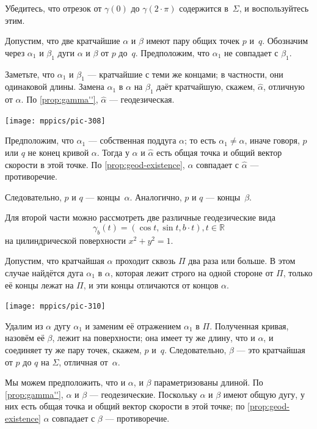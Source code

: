 \begin{multicols}{2}
Убедитесь, что отрезок от $\gamma (0)$ до $\gamma (2{\cdot}\pi)$ содержится в~$\Sigma$,
и воспользуйтесь этим.

Допустим, что две кратчайшие $\alpha$ и $\beta$ имеют пару общих точек $p$ и~$q$.
Обозначим через $\alpha_1$ и $\beta_1$ дуги $\alpha$ и $\beta$ от $p$ до~$q$.
Предположим, что $\alpha_1$ не совпадает с $\beta_1$.

Заметьте, что $\alpha_1$ и $\beta_1$ --- кратчайшие с теми же концами;
в частности, они одинаковой длины.
Замена $\alpha_1$ в $\alpha$ на $\beta_1$ даёт кратчайшую, скажем, $\hat\alpha$, отличную от $\alpha$.
По \ref{prop:gamma''}, $\hat\alpha$ --- геодезическая.

\begin{Figure}
\vskip-0mm
\centering
\texttt{[image: mppics/pic-308]}
\vskip0mm
\end{Figure}

Предположим, что $\alpha_1$ --- собственная поддуга $\alpha$;
то есть $\alpha_1\ne\alpha$, иначе говоря, $p$ или $q$ не конец кривой $\alpha$.
Тогда у $\alpha$ и $\hat\alpha$ есть общая точка и общий вектор скорости в этой точке.
По \ref{prop:geod-existence}, $\alpha$ совпадает с $\hat\alpha$ --- противоречие.

Следовательно, $p$ и $q$ --- концы~$\alpha$.
Аналогично, $p$ и $q$ --- концы~$\beta$.

Для второй части можно рассмотреть две различные геодезические вида 
\[ \gamma_b(t) = ( \cos t , \sin t , b\cdot t ) , t \in \mathbb{R} \]
на цилиндрической поверхности $x^2 + y^2 =1$.

Допустим, что кратчайшая $\alpha$ проходит сквозь $\Pi$ два раза или больше.
В этом случае найдётся дуга $\alpha_1$ в $\alpha$, которая лежит строго на одной стороне от $\Pi$, только её концы лежат на $\Pi$, и эти концы отличаются от концов $\alpha$.

\begin{Figure}
\vskip-1mm
\centering
\texttt{[image: mppics/pic-310]}
\vskip-1mm
\end{Figure}

Удалим из $\alpha$ дугу $\alpha_1$ и заменим её отражением $\alpha_1$ в $\Pi$.
Полученная кривая, назовём её $\beta$, лежит на поверхности;
она имеет ту же длину, что и $\alpha$, и соединяет ту же пару точек, скажем, $p$ и~$q$.
Следовательно, $\beta$ --- это кратчайшая от $p$ до $q$ на $\Sigma$, отличная от~$\alpha$.

Мы можем предположить, что и $\alpha$, и $\beta$ параметризованы длиной.
По \ref{prop:gamma''}, $\alpha$ и $\beta$ --- геодезические.
Поскольку $\alpha$ и $\beta$ имеют общую дугу, у них есть общая точка и общий вектор скорости в этой точке;
по \ref{prop:geod-existence} $\alpha$ совпадает с $\beta$ --- противоречие.


\end{multicols}

